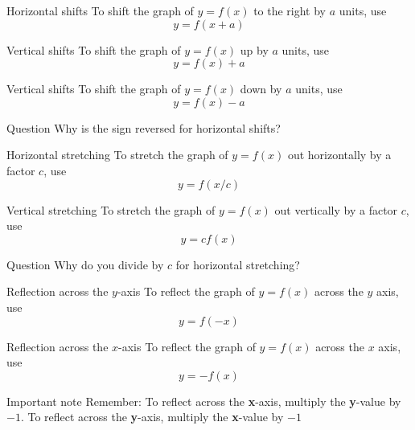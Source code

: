 \documentclass[t,handout]{beamer}
\begin{document}
\begin{frame}{Horizontal shifts}
To shift the graph of $y = f(x)$ to the right by $a$ units, use
$$y = f(x + a)$$
\end{frame}

\begin{frame}{Vertical shifts}
To shift the graph of $y = f(x)$ up by $a$ units, use
$$y = f(x) +  a$$
\end{frame}

\begin{frame}{Vertical shifts}
To shift the graph of $y = f(x)$ down by $a$ units, use
$$y = f(x) - a$$
\end{frame}

\begin{frame}{Question}
Why is the sign reversed for horizontal shifts?
\end{frame}

\begin{frame}{Horizontal stretching}
To stretch the graph of $y = f(x)$ out horizontally by a factor $c$, use
$$y = f(x/c)$$
\end{frame}

\begin{frame}{Vertical stretching}
To stretch the graph of $y = f(x)$ out vertically by a factor $c$, use
$$y = cf(x)$$
\end{frame}

\begin{frame}{Question}
Why do you divide by $c$ for horizontal stretching?
\end{frame}

\begin{frame}{Reflection across the $y$-axis}
To reflect the graph of $y = f(x)$ across the $y$ axis, use
$$y = f(-x)$$
\end{frame}

\begin{frame}{Reflection across the $x$-axis}
To reflect the graph of $y = f(x)$ across the $x$ axis, use
$$y = -f(x)$$
\end{frame}

\begin{frame}{Important note}
Remember: To reflect across the \textbf{x}-axis, multiply the \textbf{y}-value by $-1$.
To reflect across the \textbf{y}-axis, multiply the \textbf{x}-value by $-1$
\end{frame}
\end{document}
